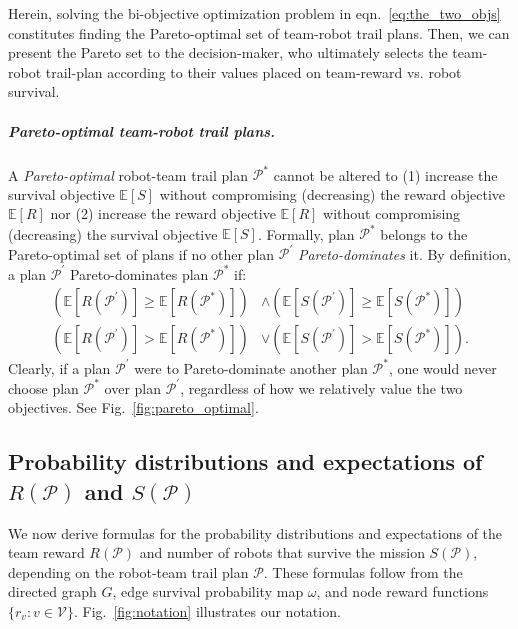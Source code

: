 \documentclass[11pt, oneside]{article}
\begin{document}
Herein, solving the bi-objective optimization problem in eqn.~\ref{eq:the_two_objs} constitutes finding the Pareto-optimal set of team-robot trail plans. Then, we can present the Pareto set to the decision-maker, who ultimately selects the team-robot trail-plan according to their values placed on team-reward vs. robot survival. 

\subparagraph{Pareto-optimal team-robot trail plans.} 
A \emph{Pareto-optimal} \cite{pardalos2017non} robot-team trail plan $\mathcal{P}^*$ cannot be altered to
(1) increase the survival objective $\mathbb{E}[S]$ without compromising (decreasing) the reward objective $\mathbb{E}[R]$
nor
(2) increase the reward objective $\mathbb{E}[R]$ without compromising (decreasing) the survival objective $\mathbb{E}[S]$.
Formally, plan $\mathcal{P}^*$ belongs to the Pareto-optimal set of plans if no other plan $\mathcal{P}^\prime$ \emph{Pareto-dominates} it. By definition, a plan $\mathcal{P}^\prime$ Pareto-dominates plan $\mathcal{P}^*$ if:
\begin{align}
	\left (\mathbb{E}[R(\mathcal{P}^\prime)] \geq \mathbb{E}[R(\mathcal{P}^*)]  \right) & \wedge \left( \mathbb{E}[S(\mathcal{P}^\prime)] \geq \mathbb{E}[S(\mathcal{P}^*)] \right) \\
	\left( \mathbb{E}[R(\mathcal{P}^\prime)] > \mathbb{E}[R(\mathcal{P}^*)] \right) & \vee \left( \mathbb{E}[S(\mathcal{P}^\prime)] > \mathbb{E}[S(\mathcal{P}^*)] \right).
\end{align}
Clearly, if a plan $\mathcal{P}^\prime$ were to Pareto-dominate another plan $\mathcal{P}^*$, one would never choose plan $\mathcal{P}^*$ over plan $\mathcal{P}^\prime$, regardless of how we relatively value the two objectives.
See Fig.~\ref{fig:pareto_optimal}.

\subsection{Probability distributions and expectations of $R(\mathcal{P})$ and $S(\mathcal{P})$}
We now derive formulas for the probability distributions and expectations of the team reward $R(\mathcal{P})$ and number of robots that survive the mission $S(\mathcal{P})$, depending on the robot-team trail plan $\mathcal{P}$. 
These formulas follow from the directed graph $G$, edge survival probability map $\omega$, and node reward functions $\{r_v : v \in \mathcal{V}\}$. Fig.~\ref{fig:notation} illustrates our notation.
\end{document}
